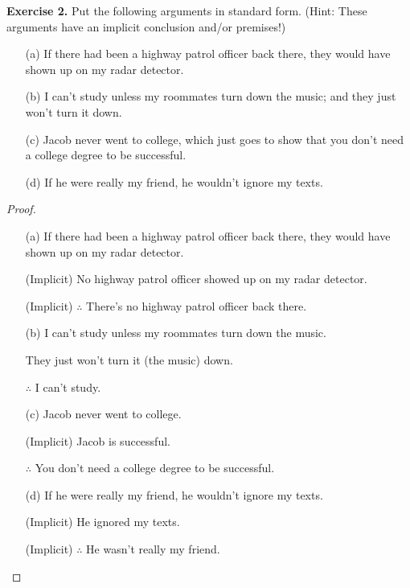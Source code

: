 \documentclass{article}
\begin{document}
\pagebreak

\begin{ques}\label{q2}
\textbf{Exercise 2.} Put the following arguments in standard form. (Hint: These arguments have an implicit conclusion and/or premises!)

\begin{enumerate}
\item[(a)] If there had been a highway patrol officer back there, they would have shown up on my radar detector.

\item[(b)] I can’t study unless my roommates turn down the music; and they just won’t turn it down.

\item[(c)] Jacob never went to college, which just goes to show that you don’t need a college degree to be successful.

\item[(d)] If he were really my friend, he wouldn’t ignore my texts.
\end{enumerate}
\end{ques}

\begin{proof}
    
    \hfil

    \begin{itemize}
        \item[(a)] If there had been a highway patrol officer back there, they would have shown up on my radar detector.
        
        (Implicit) No highway patrol officer showed up on my radar detector.
        
        (Implicit) $\therefore$ There's no highway patrol officer back there.

        \item[(b)] I can't study unless my roommates turn down the music.
        
        They just won't turn it (the music) down.

        $\therefore$ I can't study.

        \item[(c)] Jacob never went to college.
        
        (Implicit) Jacob is successful.

        $\therefore$ You don't need a college degree to be successful.

        \item[(d)] If he were really my friend, he wouldn't ignore my texts.
        
        (Implicit) He ignored my texts.

        (Implicit) $\therefore$ He wasn't really my friend.
    \end{itemize}
\end{proof}
\end{document}
